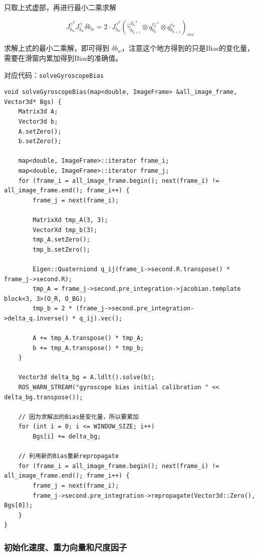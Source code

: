 \documentclass[12pt,a4paper]{article}
\begin{document}
只取上式虚部，再进行最小二乘求解

\begin{equation}
J^{\gamma^{T}}_{b_{w}}J^{\gamma }_{b_{w}}\delta b_{w}=
2 \cdot J^{\gamma^{T}}_{b_{w}}(\hat{\gamma}_{b_{k+1}}^{b_{k}^{-1}}\otimes q^{c_{0}^{-1}}_{b_{k}}\otimes q^{c_{0}}_{b_{k+1}})_{vec}
\end{equation}

求解上式的最小二乘解，即可得到 $\delta b_{w}$，注意这个地方得到的只是Bias的变化量，需要在滑窗内累加得到Bias的准确值。   

对应代码：\verb|solveGyroscopeBias|

\begin{lstlisting}
void solveGyroscopeBias(map<double, ImageFrame> &all_image_frame, Vector3d* Bgs) {
    Matrix3d A;
    Vector3d b;
    A.setZero();
    b.setZero();

    map<double, ImageFrame>::iterator frame_i;
    map<double, ImageFrame>::iterator frame_j;
    for (frame_i = all_image_frame.begin(); next(frame_i) != all_image_frame.end(); frame_i++) {
        frame_j = next(frame_i);

        MatrixXd tmp_A(3, 3);
        VectorXd tmp_b(3);
        tmp_A.setZero();
        tmp_b.setZero();

        Eigen::Quaterniond q_ij(frame_i->second.R.transpose() * frame_j->second.R);
        tmp_A = frame_j->second.pre_integration->jacobian.template block<3, 3>(O_R, O_BG);
        tmp_b = 2 * (frame_j->second.pre_integration->delta_q.inverse() * q_ij).vec();

        A += tmp_A.transpose() * tmp_A;
        b += tmp_A.transpose() * tmp_b;
    }

    Vector3d delta_bg = A.ldlt().solve(b);
    ROS_WARN_STREAM("gyroscope bias initial calibration " << delta_bg.transpose());

    // 因为求解出的Bias是变化量，所以要累加
    for (int i = 0; i <= WINDOW_SIZE; i++)
        Bgs[i] += delta_bg;

    // 利用新的Bias重新repropagate
    for (frame_i = all_image_frame.begin(); next(frame_i) != all_image_frame.end(); frame_i++) {
        frame_j = next(frame_i);
        frame_j->second.pre_integration->repropagate(Vector3d::Zero(), Bgs[0]);
    }
}
\end{lstlisting}

\subsubsection{初始化速度、重力向量和尺度因子}
\end{document}
